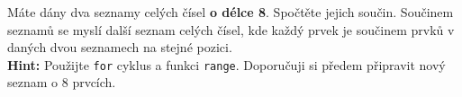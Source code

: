 \question[50]
Máte dány dva seznamy celých čísel
\textbf{o délce 8}. Spočtěte jejich
součin. Součinem seznamů se myslí další
seznam celých čísel, kde každý prvek je
součinem prvků v daných dvou seznamech
na stejné pozici.\\
\textbf{Hint:} Použijte \texttt{for} cyklus a funkci \texttt{range}. Doporučuji
si předem připravit nový seznam o 8 prvcích.